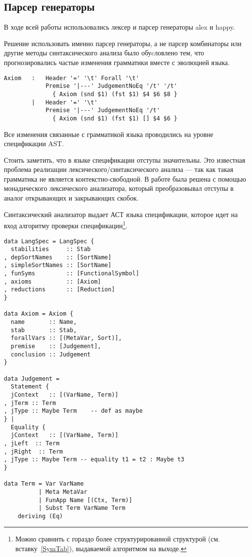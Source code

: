 \subsection{Парсер генераторы}
В ходе всей работы использовались лексер и парсер генераторы alex\cite{alex} и happy\cite{happy}.

Решение использовать именно парсер генераторы, а не парсер комбинаторы\cite{parsec} или другие методы синтаксического анализа было обуcловлено тем, что прогнозировались частые изменения грамматики вместе с эволюцией языка.

\begin{lstlisting}[caption={Часть спецификации парсера},captionpos=b, frame=single]
Axiom   :   Header '=' '\t' Forall '\t'
            Premise '|---' JudgementNoEq '/t' '/t'
              { Axiom (snd $1) (fst $1) $4 $6 $8 }
        |   Header '=' '\t'
            Premise '|---' JudgementNoEq '/t'
              { Axiom (snd $1) (fst $1) [] $4 $6 }
\end{lstlisting}

Все изменения связанные с грамматикой языка проводились на уровне спецификации AST.

\hfill

Стоить заметить, что в языке спецификации отступы значительны. Это известная проблема реализации лексического/синтаксического анализа --- так как такая грамматика не является контекстно-свободной. В работе была решена с помощью монадического лексического анализатора, который преобразовывал отступы в аналог открывающих и закрывающих скобок.

Синтаксический анализатор выдает АСТ языка спецификации, которое идет на вход алгоритму проверки спецификации\footnote{Можно сравнить с гораздо более структурированной структурой (см. вставку~\ref{SymTab}), выдаваемой алгоритмом на выходе.}.

\begin{lstlisting}[caption={АСТ языка спецификации},captionpos=b,frame=single]
data LangSpec = LangSpec {
  stabilities     :: Stab
, depSortNames    :: [SortName]
, simpleSortNames :: [SortName]
, funSyms         :: [FunctionalSymbol]
, axioms          :: [Axiom]
, reductions      :: [Reduction]
}

data Axiom = Axiom {
  name       :: Name,
  stab       :: Stab,
  forallVars :: [(MetaVar, Sort)],
  premise    :: [Judgement],
  conclusion :: Judgement
}

data Judgement =
  Statement {
  jContext   :: [(VarName, Term)]
, jTerm :: Term
, jType :: Maybe Term    -- def as maybe
} |
  Equality {
  jContext   :: [(VarName, Term)]
, jLeft  :: Term
, jRight  :: Term
, jType :: Maybe Term -- equality t1 = t2 : Maybe t3
}

data Term = Var VarName
          | Meta MetaVar
          | FunApp Name [(Ctx, Term)]
          | Subst Term VarName Term
    deriving (Eq)
\end{lstlisting}


